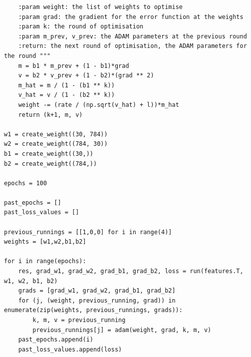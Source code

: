 \documentclass[fleqn]{report}
\begin{document}
\begin{verbatim}
    :param weight: the list of weights to optimise
    :param grad: the gradient for the error function at the weights
    :param k: the round of optimisation
    :param m_prev, v_prev: the ADAM parameters at the previous round
    :return: the next round of optimisation, the ADAM parameters for the round """
    m = b1 * m_prev + (1 - b1)*grad
    v = b2 * v_prev + (1 - b2)*(grad ** 2)
    m_hat = m / (1 - (b1 ** k))
    v_hat = v / (1 - (b2 ** k))
    weight -= (rate / (np.sqrt(v_hat) + l))*m_hat
    return (k+1, m, v)
    
w1 = create_weight((30, 784))
w2 = create_weight((784, 30))
b1 = create_weight((30,))
b2 = create_weight((784,))

epochs = 100

past_epochs = []
past_loss_values = []

previous_runnings = [[1,0,0] for i in range(4)]
weights = [w1,w2,b1,b2]

for i in range(epochs):
    res, grad_w1, grad_w2, grad_b1, grad_b2, loss = run(features.T, w1, w2, b1, b2)
    grads = [grad_w1, grad_w2, grad_b1, grad_b2]
    for (j, (weight, previous_running, grad)) in enumerate(zip(weights, previous_runnings, grads)):
        k, m, v = previous_running
        previous_runnings[j] = adam(weight, grad, k, m, v)
    past_epochs.append(i)
    past_loss_values.append(loss)

\end{verbatim}
\end{document}
